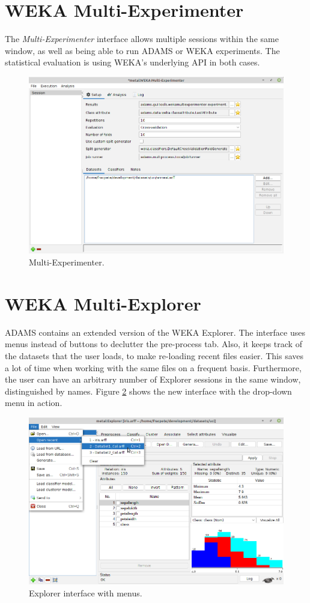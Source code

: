 \clearpage
\section{WEKA Multi-Experimenter}
The \textit{Multi-Experimenter} interface allows multiple sessions within the same window,
as well as being able to run ADAMS or WEKA experiments. The statistical evaluation is
using WEKA's underlying API in both cases.

\begin{figure}[htb]
  \centering
  \includegraphics[width=12.0cm]{images/multi-experimenter.png}
  \caption{Multi-Experimenter.}
  \label{multi-experimenter}
\end{figure}

\clearpage
\section{WEKA Multi-Explorer}
ADAMS contains an extended version of the WEKA Explorer. The interface uses
menus instead of buttons to declutter the pre-process tab. Also, it keeps track
of the datasets that the user loads, to make re-loading recent files easier.
This saves a lot of time when working with the same files on a frequent basis.
Furthermore, the user can have an arbitrary number of Explorer sessions in the
same window, distinguished by names. Figure \ref{explorerext} shows the new
interface with the drop-down menu in action.

\begin{figure}[htb]
  \centering
  \includegraphics[width=12.0cm]{images/explorerext.png}
  \caption{Explorer interface with menus.}
  \label{explorerext}
\end{figure}

